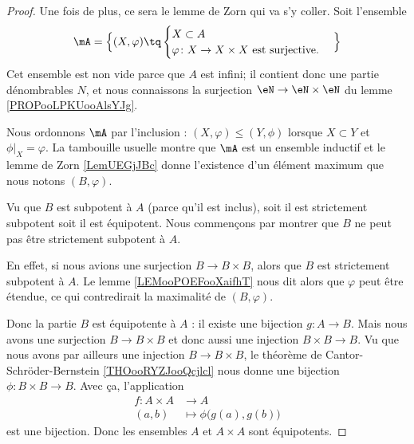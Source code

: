 \begin{proof}
    Une fois de plus, ce sera le lemme de Zorn qui va s'y coller. Soit l'ensemble
    \begin{equation}
       \mA=\Big\{  (X,\varphi)  \tq
        \begin{cases}
            X\subset A\\
            \varphi\colon X\to X\times X\text{ est surjective.}
        \end{cases}
    \Big\}
    \end{equation}
    Cet ensemble est non vide parce que \( A\) est infini; il contient donc une partie dénombrables \( N\), et nous connaissons la surjection \( \eN\to \eN\times \eN\) du lemme \ref{PROPooLPKUooAlsYJg}.

    Nous ordonnons \( \mA\) par l'inclusion : \( (X,\varphi)\leq (Y,\phi)\) lorsque \( X\subset Y\) et \( \phi|_X=\varphi\). La tambouille usuelle montre que \( \mA\) est un ensemble inductif et le lemme de Zorn \ref{LemUEGjJBc} donne l'existence d'un élément maximum que nous notons \( (B,\varphi)\).

    Vu que \( B\) est subpotent à \( A\) (parce qu'il est inclus), soit il est strictement subpotent soit il est équipotent. Nous commençons par montrer que \( B\) ne peut pas être strictement subpotent à \( A\).

    En effet, si nous avions une surjection \( B\to B\times B\), alors que \( B\) est strictement subpotent à \( A\). Le lemme \ref{LEMooPOEFooXaifhT} nous dit alors que \( \varphi\) peut être étendue, ce qui contredirait la maximalité de \( (B,\varphi)\).

    Donc la partie \( B\) est équipotente à \( A\) : il existe une bijection \( g\colon A\to B\). Mais nous avons une surjection \( B\to B\times B\) et donc aussi une injection \( B\times B\to B\). Vu que nous avons par ailleurs une injection \( B\to B\times B\), le théorème de Cantor-Schröder-Bernstein \ref{THOooRYZJooQcjlcl} nous donne une bijection \( \phi\colon B\times B\to B\). Avec ça, l'application
    \begin{equation}
        \begin{aligned}
            f\colon A\times A&\to A \\
            (a,b)&\mapsto \phi\big( g(a),g(b) \big) 
        \end{aligned}
    \end{equation}
    est une bijection. Donc les ensembles \( A\) et \( A\times A\) sont équipotents.
\end{proof}

